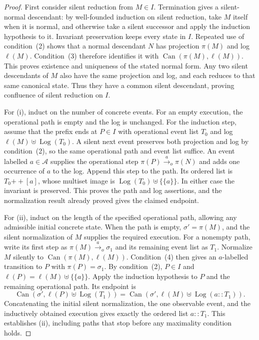 \begin{proof}
First consider silent reduction from $M\in I$. Termination gives a
silent-normal descendant: by well-founded induction on silent reduction,
take $M$ itself when it is normal, and otherwise take a silent successor
and apply the induction hypothesis to it. Invariant preservation keeps
every state in $I$. Repeated use of condition~(2) shows that a normal
descendant $N$ has projection $\pi(M)$ and log $\ell(M)$. Condition~(3)
therefore identifies it with $\operatorname{Can}(\pi(M),\ell(M))$.
This proves existence and uniqueness of the stated normal form. Any two
silent descendants of $M$ also have the same projection and log, and
each reduces to that same canonical state. Thus they have a common
silent descendant, proving confluence of silent reduction on $I$.

For (i), induct on the number of concrete events. For an empty execution,
the operational path is empty and the log is unchanged. For the induction
step, assume that the prefix ends at $P\in I$ with operational event list
$T_0$ and log $\ell(M)\uplus\operatorname{Log}(T_0)$. A silent next event
preserves both projection and log by condition~(2), so the same operational
path and event list suffice. An event labelled $a\in\mathcal A$ supplies
the operational step $\pi(P)\xrightarrow{a}_o\pi(N)$ and adds one occurrence
of $a$ to the log. Append this step to the path. Its ordered list is
$T_0\mathbin{+\!+}[a]$, whose multiset image is
$\operatorname{Log}(T_0)\uplus\{\!\{a\}\!\}$. In either case the
invariant is preserved. This proves the path and log assertions, and the
normalization result already proved gives the claimed endpoint.

For (ii), induct on the length of the specified operational path, allowing
any admissible initial concrete state. When the path is empty,
$\sigma'=\pi(M)$, and the silent normalization of $M$ supplies the required
execution. For a nonempty path, write its first step as
$\pi(M)\xrightarrow{a}_o\sigma_1$ and its remaining event list as $T_1$.
Normalize $M$ silently to $\operatorname{Can}(\pi(M),\ell(M))$.
Condition~(4) then gives an $a$-labelled transition to $P$ with
$\pi(P)=\sigma_1$. By condition~(2), $P\in I$ and
$\ell(P)=\ell(M)\uplus\{\!\{a\}\!\}$. Apply the induction hypothesis
to $P$ and the remaining operational path. Its endpoint is
\[
 \operatorname{Can}(\sigma',\ell(P)\uplus\operatorname{Log}(T_1))
 =\operatorname{Can}(\sigma',\ell(M)\uplus\operatorname{Log}(a::T_1)).
\]
Concatenating the initial silent normalization, the one observable event,
and the inductively obtained execution gives exactly the ordered list
$a::T_1$. This establishes (ii), including paths that stop before any
maximality condition holds.
\end{proof}

